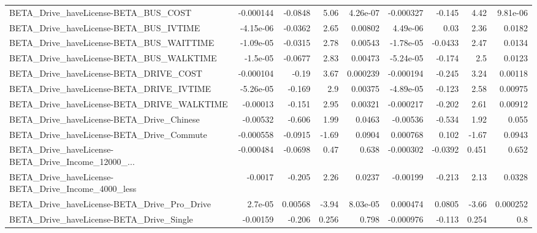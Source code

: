 \begin{tabular}{lrrrrrrrr}
BETA\_Drive\_haveLicense-BETA\_BUS\_COST               &   -0.000144 &      -0.0848 &      5.06 & 4.26e-07 &  -0.000327 &      -0.145 &         4.42 &      9.81e-06 \\
BETA\_Drive\_haveLicense-BETA\_BUS\_IVTIME             &   -4.15e-06 &      -0.0362 &      2.65 &  0.00802 &   4.49e-06 &        0.03 &         2.36 &        0.0182 \\
BETA\_Drive\_haveLicense-BETA\_BUS\_WAITTIME           &   -1.09e-05 &      -0.0315 &      2.78 &  0.00543 &  -1.78e-05 &     -0.0433 &         2.47 &        0.0134 \\
BETA\_Drive\_haveLicense-BETA\_BUS\_WALKTIME           &    -1.5e-05 &      -0.0677 &      2.83 &  0.00473 &  -5.24e-05 &      -0.174 &          2.5 &        0.0123 \\
BETA\_Drive\_haveLicense-BETA\_DRIVE\_COST             &   -0.000104 &        -0.19 &      3.67 & 0.000239 &  -0.000194 &      -0.245 &         3.24 &       0.00118 \\
BETA\_Drive\_haveLicense-BETA\_DRIVE\_IVTIME           &   -5.26e-05 &       -0.169 &       2.9 &  0.00375 &  -4.89e-05 &      -0.123 &         2.58 &       0.00975 \\
BETA\_Drive\_haveLicense-BETA\_DRIVE\_WALKTIME         &    -0.00013 &       -0.151 &      2.95 &  0.00321 &  -0.000217 &      -0.202 &         2.61 &       0.00912 \\
BETA\_Drive\_haveLicense-BETA\_Drive\_Chinese          &    -0.00532 &       -0.606 &      1.99 &   0.0463 &   -0.00536 &      -0.534 &         1.92 &         0.055 \\
BETA\_Drive\_haveLicense-BETA\_Drive\_Commute          &   -0.000558 &      -0.0915 &     -1.69 &   0.0904 &   0.000768 &       0.102 &        -1.67 &        0.0943 \\
BETA\_Drive\_haveLicense-BETA\_Drive\_Income\_12000\_... &   -0.000484 &      -0.0698 &      0.47 &    0.638 &  -0.000302 &     -0.0392 &        0.451 &         0.652 \\
BETA\_Drive\_haveLicense-BETA\_Drive\_Income\_4000\_less &     -0.0017 &       -0.205 &      2.26 &   0.0237 &   -0.00199 &      -0.213 &         2.13 &        0.0328 \\
BETA\_Drive\_haveLicense-BETA\_Drive\_Pro\_Drive        &     2.7e-05 &      0.00568 &     -3.94 & 8.03e-05 &   0.000474 &      0.0805 &        -3.66 &      0.000252 \\
BETA\_Drive\_haveLicense-BETA\_Drive\_Single           &    -0.00159 &       -0.206 &     0.256 &    0.798 &  -0.000976 &      -0.113 &        0.254 &           0.8 \\

\end{tabular}
